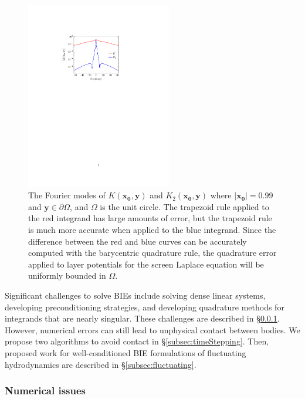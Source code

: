 \begin{figure}
\centerline{\includegraphics[width=2.5in]{figures/integrands}}
\vspace*{-13pt}
  \caption{{\footnotesize The Fourier modes of
  $K(\mathbf{x_0},\mathbf{y})$ and $K_2(\mathbf{x_0},\mathbf{y})$ where
  $|\mathbf{x_0}| = 0.99$ and $\mathbf{y} \in \partial\Omega$, and
  $\Omega$ is the unit circle. The trapezoid rule applied to the red
  integrand has large amounts of error, but the trapezoid rule is much
  more accurate when applied to the blue integrand. Since the difference
  between the red and blue curves can be accurately computed with the
  barycentric quadrature rule, the quadrature error applied to layer
  potentials for the screen Laplace equation will be uniformly bounded
  in $\Omega$.}}
\label{fig:integrands}
\end{figure}
Significant challenges to solve BIEs include solving dense linear
systems, developing preconditioning strategies, and developing
quadrature methods for integrands that are nearly singular. These
challenges are described in \S\ref{subsec:NumericalIssues}. However,
numerical errors can still lead to unphysical contact between bodies. We
propose two algorithms to avoid contact in \S\ref{subsec:timeStepping}.
Then, proposed work for well-conditioned BIE formulations of fluctuating
hydrodynamics are described in \S\ref{subsec:fluctuating}.


\subsubsection{Numerical issues}
\label{subsec:NumericalIssues}


